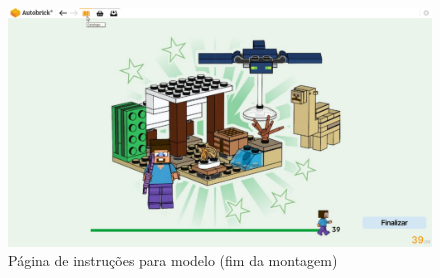         \begin{figure}[h!]
            \centering
            \includegraphics[width=0.99\linewidth, frame]{images/Instructions Manual II.pdf}
            \caption{Página de instruções para modelo (fim da montagem)}
            \label{fig:Modelo Fim}
        \end{figure}
    
